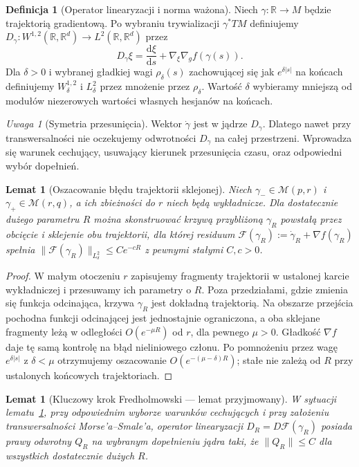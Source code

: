 \documentclass[11pt,a4paper,oneside]{report}
\newcommand{\R}{\mathbb{R}}
\newcommand{\dd}{\mathrm d}
\theoremstyle{plain}
\newtheorem{lemat}[twierdzenie]{Lemat}
\theoremstyle{definition}
\newtheorem{definicja}[twierdzenie]{Definicja}
\theoremstyle{remark}
\newtheorem{uwaga}[twierdzenie]{Uwaga}
\begin{document}
\begin{definicja}[Operator linearyzacji i norma ważona]
Niech $\gamma:\R\to M$ będzie trajektorią gradientową.
Po wybraniu trywializacji $\gamma^*TM$ definiujemy
$D_\gamma:W^{1,2}(\R,\R^d)\to L^2(\R,\R^d)$ przez
\[
D_\gamma\xi=\frac{\dd\xi}{\dd s}
+\nabla_\xi\nabla_g f(\gamma(s)).
\]
Dla $\delta>0$ i wybranej gładkiej wagi
$\rho_\delta(s)$ zachowującej się jak
$e^{\delta|s|}$ na końcach definiujemy
$W^{1,2}_\delta$ i $L^2_\delta$ przez mnożenie przez
$\rho_\delta$. Wartość $\delta$ wybieramy mniejszą od
modułów niezerowych wartości własnych hesjanów na końcach.
\end{definicja}
\begin{uwaga}[Symetria przesunięcia]
Wektor $\dot\gamma$ jest w jądrze $D_\gamma$.
Dlatego nawet przy transwersalności nie oczekujemy
odwrotności $D_\gamma$ na całej przestrzeni.
Wprowadza się warunek cechujący, usuwający kierunek
przesunięcia czasu, oraz odpowiedni wybór dopełnień.
\end{uwaga}
\begin{lemat}[Oszacowanie błędu trajektorii sklejonej]
\label{lem:xviii-preglue}
Niech $\gamma_-\in\mathcal M(p,r)$ i
$\gamma_+\in\mathcal M(r,q)$, a ich zbieżności do $r$
niech będą wykładnicze. Dla dostatecznie dużego parametru
$R$ można skonstruować krzywą przybliżoną $\gamma_R$
powstałą przez obcięcie i sklejenie obu trajektorii,
dla której residuum
$\mathcal F(\gamma_R):=\dot\gamma_R+\nabla f(\gamma_R)$
spełnia $\|\mathcal F(\gamma_R)\|_{L^2_\delta}
\le C e^{-cR}$ z pewnymi stałymi $C,c>0$.
\end{lemat}
\begin{proof}
W małym otoczeniu $r$ zapisujemy fragmenty trajektorii
w ustalonej karcie wykładniczej i przesuwamy ich parametry
o $R$. Poza przedziałami, gdzie zmienia się funkcja
odcinająca, krzywa $\gamma_R$ jest dokładną trajektorią.
Na obszarze przejścia pochodna funkcji odcinającej jest
jednostajnie ograniczona, a oba sklejane fragmenty
leżą w odległości $O(e^{-\mu R})$ od $r$, dla pewnego
$\mu>0$. Gładkość $\nabla f$ daje tę samą kontrolę
na błąd nieliniowego członu. Po pomnożeniu przez
wagę $e^{\delta|s|}$ z $\delta<\mu$ otrzymujemy
oszacowanie $O(e^{-(\mu-\delta)R})$; stałe nie zależą
od $R$ przy ustalonych końcowych trajektoriach.
\end{proof}
\begin{lemat}[Kluczowy krok Fredholmowski --- lemat przyjmowany]
\label{lem:xviii-uniform-right-inverse}
W sytuacji lematu~\ref{lem:xviii-preglue}, przy odpowiednim
wyborze warunków cechujących i przy założeniu
transwersalności Morse'a--Smale'a, operator linearyzacji
$D_R=D\mathcal F(\gamma_R)$ posiada prawy odwrotny
$Q_R$ na wybranym dopełnieniu jądra taki, że
$\|Q_R\|\le C$ dla wszystkich dostatecznie dużych $R$.
\end{lemat}
\end{document}
